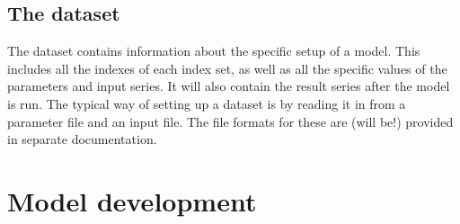 \documentclass[]{memoir}
\begin{document}
\section{The dataset}

The dataset contains information about the specific setup of a model. This includes all the indexes of each index set, as well as all the specific values of the parameters and input series. It will also contain the result series after the model is run. The typical way of setting up a dataset is by reading it in from a parameter file and an input file. The file formats for these are (will be!) provided in separate documentation.

\chapter{Model development}
\end{document}
